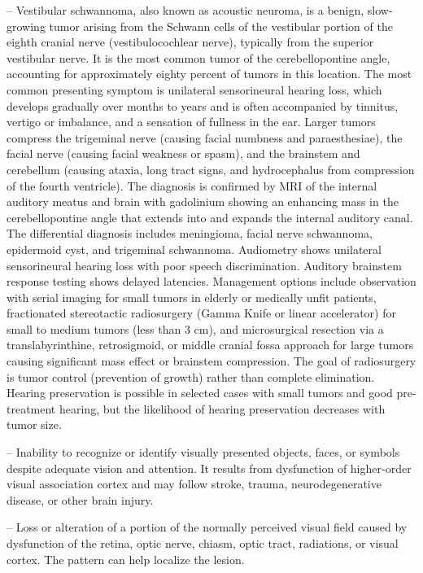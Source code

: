 -- Vestibular schwannoma, also known as acoustic neuroma, is a benign, slow-growing tumor arising from the Schwann cells of the vestibular portion of the eighth cranial nerve (vestibulocochlear nerve), typically from the superior vestibular nerve. It is the most common tumor of the cerebellopontine angle, accounting for approximately eighty percent of tumors in this location. The most common presenting symptom is unilateral sensorineural hearing loss, which develops gradually over months to years and is often accompanied by tinnitus, vertigo or imbalance, and a sensation of fullness in the ear. Larger tumors compress the trigeminal nerve (causing facial numbness and paraesthesiae), the facial nerve (causing facial weakness or spasm), and the brainstem and cerebellum (causing ataxia, long tract signs, and hydrocephalus from compression of the fourth ventricle). The diagnosis is confirmed by MRI of the internal auditory meatus and brain with gadolinium showing an enhancing mass in the cerebellopontine angle that extends into and expands the internal auditory canal. The differential diagnosis includes meningioma, facial nerve schwannoma, epidermoid cyst, and trigeminal schwannoma. Audiometry shows unilateral sensorineural hearing loss with poor speech discrimination. Auditory brainstem response testing shows delayed latencies. Management options include observation with serial imaging for small tumors in elderly or medically unfit patients, fractionated stereotactic radiosurgery (Gamma Knife or linear accelerator) for small to medium tumors (less than 3 cm), and microsurgical resection via a translabyrinthine, retrosigmoid, or middle cranial fossa approach for large tumors causing significant mass effect or brainstem compression. The goal of radiosurgery is tumor control (prevention of growth) rather than complete elimination. Hearing preservation is possible in selected cases with small tumors and good pre-treatment hearing, but the likelihood of hearing preservation decreases with tumor size.

-- Inability to recognize or identify visually presented objects, faces, or symbols despite adequate vision and attention. It results from dysfunction of higher-order visual association cortex and may follow stroke, trauma, neurodegenerative disease, or other brain injury.

-- Loss or alteration of a portion of the normally perceived visual field caused by dysfunction of the retina, optic nerve, chiasm, optic tract, radiations, or visual cortex. The pattern can help localize the lesion.


